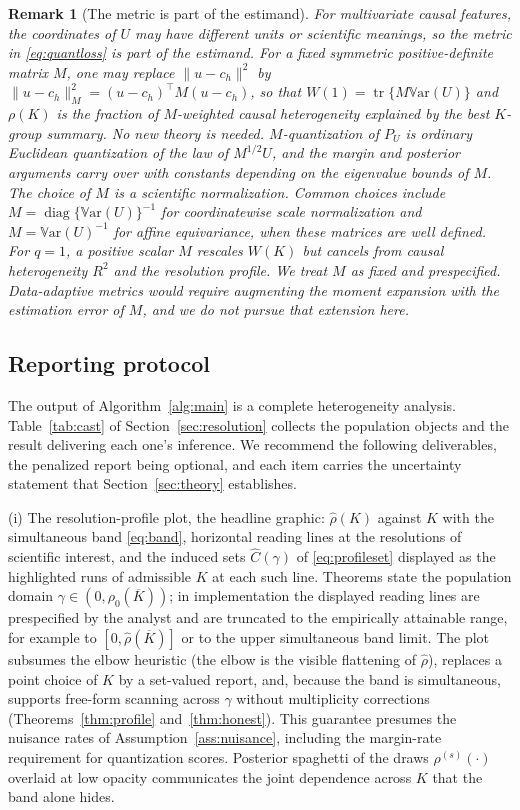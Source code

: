 \documentclass[11pt]{article}
\newtheorem{remark}{Remark}
\newcommand{\Var}{\mathbb V\mathrm{ar}}
\newcommand{\diag}{\operatorname{diag}}
\newcommand{\tr}{\operatorname{tr}}
\newcommand{\norm}[1]{\lVert #1\rVert}
\begin{document}
\begin{remark}[The metric is part of the estimand]\label{rem:metric}
For multivariate causal features, the coordinates of $U$ may have different units or scientific meanings, so the metric in \eqref{eq:quantloss} is part of the estimand.  For a fixed symmetric positive-definite matrix $M$, one may replace $\norm{u-c_h}^2$ by $\norm{u-c_h}_M^2=(u-c_h)^\top M(u-c_h)$, so that $W(1)=\tr\{M\Var(U)\}$ and $\rho(K)$ is the fraction of $M$-weighted causal heterogeneity explained by the best $K$-group summary.  No new theory is needed. $M$-quantization of $P_U$ is ordinary Euclidean quantization of the law of $M^{1/2}U$, and the margin and posterior arguments carry over with constants depending on the eigenvalue bounds of $M$.  The choice of $M$ is a scientific normalization. Common choices include $M=\diag\{\Var(U)\}^{-1}$ for coordinatewise scale normalization and $M=\Var(U)^{-1}$ for affine equivariance, when these matrices are well defined.  For $q=1$, a positive scalar $M$ rescales $W(K)$ but cancels from causal heterogeneity $R^2$ and the resolution profile.  We treat $M$ as fixed and prespecified. Data-adaptive metrics would require augmenting the moment expansion with the estimation error of $M$, and we do not pursue that extension here.
\end{remark}

\subsection{Reporting protocol}\label{sec:report}

The output of Algorithm~\ref{alg:main} is a complete heterogeneity analysis. Table~\ref{tab:cast} of Section~\ref{sec:resolution} collects the population objects and the result delivering each one's inference. We recommend the following deliverables, the penalized report being optional, and each item carries the uncertainty statement that Section~\ref{sec:theory} establishes.

(i) The resolution-profile plot, the headline graphic: $\hat\rho(K)$ against $K$ with the simultaneous band \eqref{eq:band}, horizontal reading lines at the resolutions of scientific interest, and the induced sets $\widehat C(\gamma)$ of \eqref{eq:profileset} displayed as the highlighted runs of admissible $K$ at each such line.  Theorems state the population domain $\gamma\in(0,\rho_0(\overline K))$; in implementation the displayed reading lines are prespecified by the analyst and are truncated to the empirically attainable range, for example to $[0,\hat\rho(\overline K)]$ or to the upper simultaneous band limit. The plot subsumes the elbow heuristic (the elbow is the visible flattening of $\hat\rho$), replaces a point choice of $K$ by a set-valued report, and, because the band is simultaneous, supports free-form scanning across $\gamma$ without multiplicity corrections (Theorems~\ref{thm:profile} and~\ref{thm:honest}). This guarantee presumes the nuisance rates of Assumption~\ref{ass:nuisance}, including the margin-rate requirement for quantization scores. Posterior spaghetti of the draws $\rho^{(s)}(\cdot)$ overlaid at low opacity communicates the joint dependence across $K$ that the band alone hides.
\end{document}
